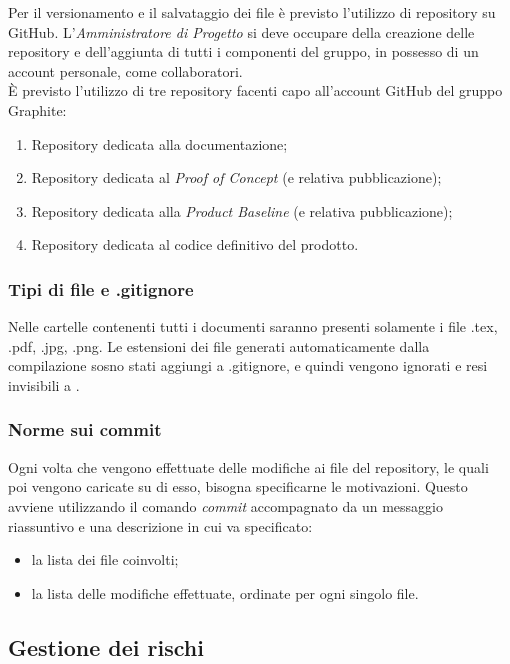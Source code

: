 \documentclass[../NormediProgetto.tex]{subfiles}
\begin{document}
	Per il versionamento e il salvataggio dei file è previsto l'utilizzo di repository su GitHub. L'\textit{Amministratore di Progetto} si deve occupare della creazione delle repository e dell'aggiunta di tutti i componenti del gruppo, in possesso di un account personale, come collaboratori.
	\\ \noindent È previsto l'utilizzo di tre repository facenti capo all'account GitHub del gruppo Graphite:
	\begin{enumerate}
		\item Repository dedicata alla documentazione;
		\item Repository dedicata al \textit{Proof of Concept} (e relativa pubblicazione);
		\item Repository dedicata alla \textit{Product Baseline} (e relativa pubblicazione);
		\item Repository dedicata al codice definitivo del prodotto.
	\end{enumerate}
	
	\subsubsection{Tipi di file e .gitignore}
	
	Nelle cartelle contenenti tutti i documenti saranno presenti solamente i file .tex, .pdf, .jpg, .png. Le estensioni dei file generati automaticamente dalla compilazione sosno stati aggiungi a .gitignore, e quindi vengono ignorati e resi invisibili a .
	
	\subsubsection{Norme sui commit}
	
	Ogni volta che vengono effettuate delle modifiche ai file del repository, le quali poi vengono caricate su di esso, bisogna specificarne le motivazioni. Questo avviene utilizzando il comando \textit{commit} accompagnato da un messaggio riassuntivo e una descrizione in cui va specificato: 
	\begin{itemize}
		\item la lista dei file coinvolti;
		\item la lista delle modifiche effettuate, ordinate per ogni singolo file.
	\end{itemize}

	\subsection{Gestione dei rischi}
	
\end{document}
